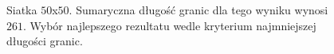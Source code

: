 \begin{figure}[h]
\begin{subfigure}{.33\textwidth}
    \caption[short]{}
\end{subfigure}
\caption{Siatka $50$x$50$. Sumaryczna długość granic dla tego wyniku wynosi $261$.
Wybór najlepszego rezultatu wedle kryterium najmniejszej długości granic.}
\label{result:12}
\end{figure}
\FloatBarrier
\lipsum
